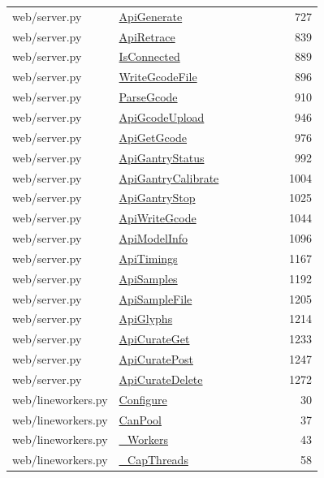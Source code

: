 \documentclass[11pt,a4paper,oneside]{report}
\begin{document}
\begin{longtable}{p{0.28\linewidth}p{0.48\linewidth}r}
web/server.py & \hyperref[fn:web-server:ApiGenerate]{ApiGenerate} & 727\\
web/server.py & \hyperref[fn:web-server:ApiRetrace]{ApiRetrace} & 839\\
web/server.py & \hyperref[fn:web-server:IsConnected]{IsConnected} & 889\\
web/server.py & \hyperref[fn:web-server:WriteGcodeFile]{WriteGcodeFile} & 896\\
web/server.py & \hyperref[fn:web-server:ParseGcode]{ParseGcode} & 910\\
web/server.py & \hyperref[fn:web-server:ApiGcodeUpload]{ApiGcodeUpload} & 946\\
web/server.py & \hyperref[fn:web-server:ApiGetGcode]{ApiGetGcode} & 976\\
web/server.py & \hyperref[fn:web-server:ApiGantryStatus]{ApiGantryStatus} & 992\\
web/server.py & \hyperref[fn:web-server:ApiGantryCalibrate]{ApiGantryCalibrate} & 1004\\
web/server.py & \hyperref[fn:web-server:ApiGantryStop]{ApiGantryStop} & 1025\\
web/server.py & \hyperref[fn:web-server:ApiWriteGcode]{ApiWriteGcode} & 1044\\
web/server.py & \hyperref[fn:web-server:ApiModelInfo]{ApiModelInfo} & 1096\\
web/server.py & \hyperref[fn:web-server:ApiTimings]{ApiTimings} & 1167\\
web/server.py & \hyperref[fn:web-server:ApiSamples]{ApiSamples} & 1192\\
web/server.py & \hyperref[fn:web-server:ApiSampleFile]{ApiSampleFile} & 1205\\
web/server.py & \hyperref[fn:web-server:ApiGlyphs]{ApiGlyphs} & 1214\\
web/server.py & \hyperref[fn:web-server:ApiCurateGet]{ApiCurateGet} & 1233\\
web/server.py & \hyperref[fn:web-server:ApiCuratePost]{ApiCuratePost} & 1247\\
web/server.py & \hyperref[fn:web-server:ApiCurateDelete]{ApiCurateDelete} & 1272\\
web/lineworkers.py & \hyperref[fn:web-lineworkers:Configure]{Configure} & 30\\
web/lineworkers.py & \hyperref[fn:web-lineworkers:CanPool]{CanPool} & 37\\
web/lineworkers.py & \hyperref[fn:web-lineworkers:-Workers]{\_Workers} & 43\\
web/lineworkers.py & \hyperref[fn:web-lineworkers:-CapThreads]{\_CapThreads} & 58\\

\end{longtable}
\end{document}
